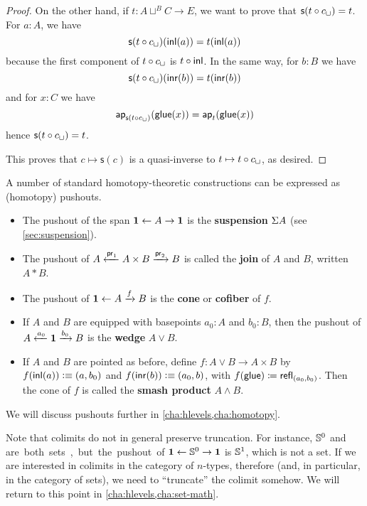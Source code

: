\begin{proof}
On the other hand, if $t:A\sqcup^BC\to{}E$, we want to prove that
$\mathsf{s}(t\circ c_\sqcup)=t$.
For $a:A$, we have
\[\mathsf{s}(t\circ c_\sqcup)(\mathsf{inl}(a))=t(\mathsf{inl}(a))\]
because the first component of $t\circ c_\sqcup$ is $t\circ\mathsf{inl}$. In
the same way, for $b:B$ we have
\[\mathsf{s}(t\circ c_\sqcup)(\mathsf{inr}(b))=t(\mathsf{inr}(b))\]
and for $x:C$ we have
\[\mathsf{ap}_{\mathsf{s}(t\circ c_\sqcup)}(\mathsf{glue}(x))
=\mathsf{ap}_{t}(\mathsf{glue}(x))\]
hence $\mathsf{s}(t\circ c_\sqcup)=t$.

This proves that $c\mapsto\mathsf{s}(c)$ is a quasi-inverse to $t\mapsto{}t\circ c_\sqcup$, as desired.
\end{proof}

A number of standard homotopy-theoretic constructions can be expressed as (homotopy) pushouts.
\begin{itemize}
\item The pushout of the span $\mathbf{1} \leftarrow A \to \mathbf{1}$ is the \textbf{suspension} $\Sigma A$ (see \autoref{sec:suspension}).
\item The pushout of $A \xleftarrow{\mathsf{pr}_{1}} A\times B \xrightarrow{\mathsf{pr}_{2}} B$ is called the \textbf{join} of $A$ and $B$, written $A*B$.
\item The pushout of $\mathbf{1} \leftarrow A \xrightarrow{f} B$ is the \textbf{cone} or \textbf{cofiber} of $f$.
\item If $A$ and $B$ are equipped with basepoints $a_0:A$ and $b_0:B$, then the pushout of $A \xleftarrow{a_0} \mathbf{1} \xrightarrow{b_0} B$ is the \textbf{wedge} $A\vee B$.
\item If $A$ and $B$ are pointed as before, define $f:A\vee B \to A\times B$ by $f(\mathsf{inl}(a))\vcentcolon\equiv (a,b_0)$ and $f(\mathsf{inr}(b))\vcentcolon\equiv (a_0,b)$, with ${f}({\mathsf{glue}}) \coloneqq \mathsf{refl}_{(a_0,b_0)}$.
  Then the cone of $f$ is called the \textbf{smash product} $A\wedge B$.
\end{itemize}
We will discuss pushouts further in \autoref{cha:hlevels,cha:homotopy}.

\begin{rmk}
  Note that colimits do not in general preserve truncation.
  For instance, $\mathbb{S}^0$ and \unit are both sets, but the pushout of $\mathbf{1} \leftarrow \mathbb{S}^0 \to \mathbf{1}$ is $\mathbb{S}^1$, which is not a set.
  If we are interested in colimits in the category of $n$-types, therefore (and, in particular, in the category of sets), we need to ``truncate'' the colimit somehow.
  We will return to this point in \autoref{cha:hlevels,cha:set-math}.
\end{rmk}



